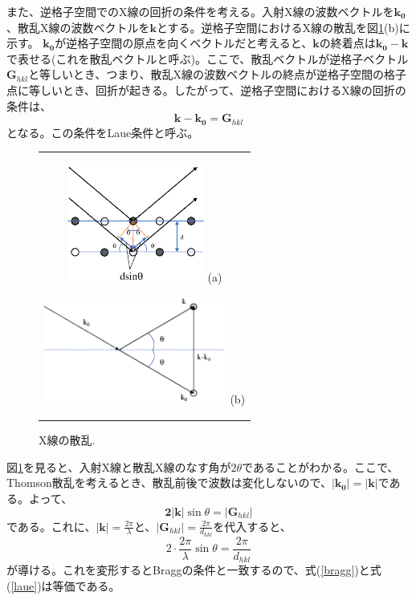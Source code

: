 \documentclass[11pt,a4j,uplatex]{jsarticle}
\begin{document}
また、逆格子空間でのX線の回折の条件を考える。入射X線の波数ベクトルを$\bm{k_0}$、散乱X線の波数ベクトルを$\bm{k}$とする。逆格子空間におけるX線の散乱を図\ref{hasuu}(b)に示す。
$\bm{k_0}$が逆格子空間の原点を向くベクトルだと考えると、$\bm{k}$の終着点は$\bm{k_0-k}$で表せる(これを散乱ベクトルと呼ぶ)。ここで、散乱ベクトルが逆格子ベクトル$\bm{G}_{hkl}$と等しいとき、つまり、散乱X線の波数ベクトルの終点が逆格子空間の格子点に等しいとき、回折が起きる。したがって、逆格子空間におけるX線の回折の条件は、
\begin{equation}
 \bm{k-k_0}=\bm{G}_{hkl}
 \label{laue}
\end{equation}
となる。この条件をLaue条件と呼ぶ。
\begin{figure}[ht]
 \centering
 \begin{tabular}{c}

  \begin{minipage}{0.5\hsize}
   \centering
   \includegraphics[clip, width=4.5cm]{dsinq.eps}
   \hspace{2cm} (a)
  \end{minipage}

  \begin{minipage}{0.5\hsize}
   \centering
   \includegraphics[clip, width=6cm]{hasuu.eps}
   \hspace{2cm} (b)
  \end{minipage}
 \end{tabular}
 \caption{X線の散乱.}
 \label{hasuu}

\end{figure}


 \newpage%
 図\ref{hasuu}を見ると、入射X線と散乱X線のなす角が$2\theta$であることがわかる。ここで、Thomson散乱を考えるとき、散乱前後で波数は変化しないので、$\bm{|k_0|=|k|}$である。よって、
 \begin{equation}
  \bm{2|k|}\sin\theta=|\bm{G}_{hkl}|
  \nonumber
 \end{equation}
 である。これに、$\bm{|k|}=\frac{2\pi}{\lambda}$と、$|\bm{G}_{hkl}|=\frac{2\pi}{d_{hkl}}$を代入すると、
 \begin{equation}
  2\cdot\frac{2\pi}{\lambda}\sin\theta=\frac{2\pi}{d_{hkl}}
  \nonumber
 \end{equation}
 が導ける。これを変形するとBraggの条件と一致するので、式(\ref{bragg})と式(\ref{laue})は等価である。
\fi
\end{document}
